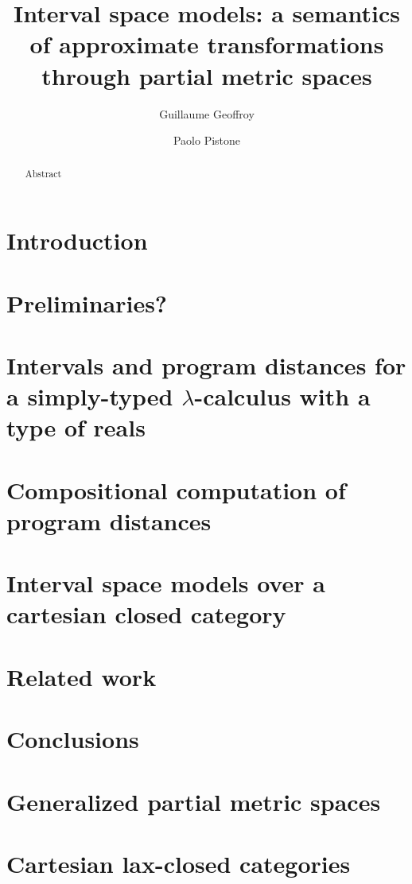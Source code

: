 \documentclass[a4paper,UKenglish,cleveref, autoref, english, thm-restate]{lipics-v2019}
\title{Interval space models: a semantics of approximate transformations through partial metric spaces} %
\author{Guillaume Geoffroy}
{Universit\`a di Bologna, Dipartimento Informatica-Scienza e Ingegneria, Italy}
{guillaume.geoffroy@unibo.it} 
{}
{}
\author{Paolo Pistone}
{Universit\`a di Bologna, Dipartimento Informatica-Scienza e Ingegneria, Italy}
{paolo.pistone2@unibo.it} 
{}
{}
\begin{document}
\maketitle

\begin{abstract}
Abstract
\end{abstract}


\section{Introduction}




\section{Preliminaries?}



\section{Intervals and program distances for a simply-typed $\lambda$-calculus with a type of reals}
\label{section:stlc}



\section{Compositional computation of program distances}



\section{Interval space models over a cartesian closed category}



\section{Related work}



\section{Conclusions}






\appendix

\section{Generalized partial metric spaces}



\section{Cartesian lax-closed categories}


\end{document}
